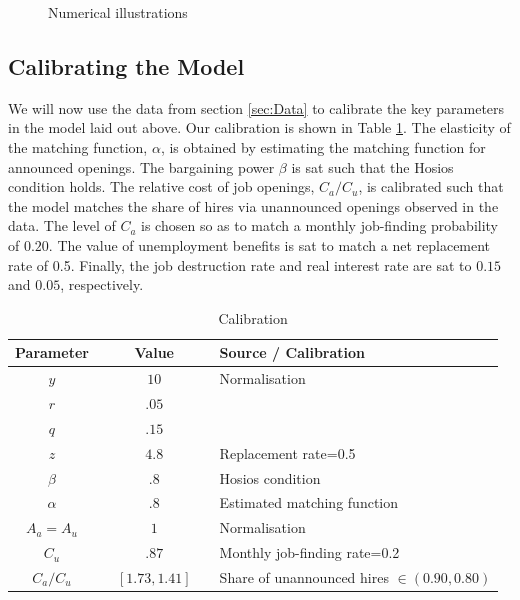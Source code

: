 \documentclass[11pt,article]{memoir}
\begin{document}
\begin{figure}[h!]
	\caption{Numerical illustrations}
	\label{fig:numeric}
\end{figure}


\subsection{Calibrating the Model}
\label{sec:Cali}

We will now use the data from section \ref{sec:Data} to calibrate the key parameters in the model laid out above.  Our calibration is shown in Table \ref{tab:calibration_full}. The elasticity of the matching function, $\alpha$, is obtained by estimating the matching function for announced openings. The bargaining power $\beta$ is sat such that the Hosios condition holds. The relative cost of job openings, $C_a/C_u$, is calibrated such that the model matches the share of hires via unannounced openings observed in the data. The level of $C_a$ is chosen so as to match a monthly job-finding probability of $0.20$. The value of unemployment benefits is sat to match a net replacement rate of 0.5. Finally, the job destruction rate and real interest rate are sat to $0.15$ and $0.05$, respectively.

\begin{table}[htbp]
\caption{Calibration}
\label{tab:calibration_full}
\begin{tabularx}{\textwidth}{cXcXl}
 \hline
  Parameter & & Value & & Source / Calibration  \\ 
  \hline 
   $y$ & & $10$   & & Normalisation    \\ 
   $r$ & & $.05$ & &             \\ 
   $q$ & & $.15$ & &            \\ 
   $z$ & & $4.8$   & & Replacement rate=0.5       \\ 
   $\beta$ & & $.8$ & & Hosios condition                 \\ 
	 $\alpha$ & & $.8$ & & Estimated matching function \\ 
	 $A_a=A_u$ & & $1$    & &  Normalisation              \\ 
	 $C_u$ & & $.87$   & & Monthly job-finding rate=0.2               \\ 
	 $C_a/C_u$ & & $[1.73, 1.41]$   & & Share of unannounced hires $\in (0.90, 0.80)$               \\ 
  \hline
\end{tabularx}
\end{table}
\end{document}
